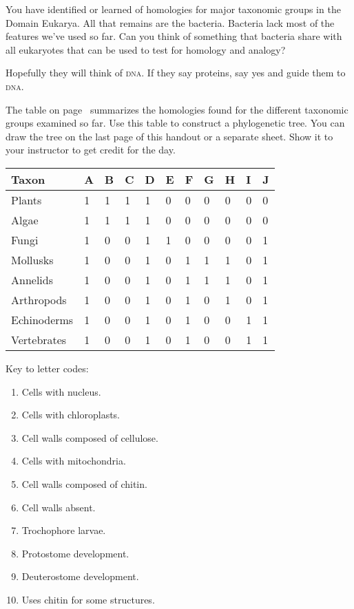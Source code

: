 \documentclass[12pt, hidelinks]{exam}
\newcommand*\AnswerBox[2]{%
    \parbox[t][#1]{0.92\textwidth}{%
    \begin{solution}#2\end{solution}}
    \vspace{\stretch{1}}
}
\begin{document}
\begin{questions}
\question
You have identified or learned of homologies for major taxonomic groups in the Domain Eukarya. All that remains are the bacteria. Bacteria lack most of the features we've used so far. Can you think of something that bacteria share with all eukaryotes that can be used to test for homology and analogy?

\AnswerBox{2\baselineskip}{Hopefully they will think of \textsc{dna}. If they say proteins, say yes and guide them to \textsc{dna.}}

\question[Checkout]
The table on page~\pageref{presence_table} summarizes the homologies found for the different taxonomic groups examined so far. Use this table to construct a phylogenetic tree. You can draw the tree on the last page of this handout or a separate sheet. Show it to your instructor to get credit for the day.


\end{questions}

\newpage

\begin{longtable}{@{}L{1in}L{0.25in}L{0.25in}L{0.25in}L{0.25in}L{0.25in}L{0.25in}L{0.25in}L{0.25in}L{0.25in}@{}}
\toprule
Taxon			&	A	&	B	&	C	&	D	&	E	&	F	&	G	&	H	&	I	&	J	\tabularnewline
\midrule
Plants			&	1	&	1	&	1	&	1	&	0	&	0	&	0	&	0	&	0	&	0	\tabularnewline
Algae			&	1	&	1	&	1	&	1	&	0	&	0	&	0	&	0	&	0	&	0	\tabularnewline
Fungi			&	1	&	0	&	0	&	1	&	1	&	0	&	0	&	0	&	0	&	1	\tabularnewline
Mollusks		&	1	&	0	&	0	&	1	&	0	&	1	&	1	&	1	&	0	&	1	\tabularnewline
Annelids		&	1	&	0	&	0	&	1	&	0	&	1	&	1	&	1	&	0	&	1	\tabularnewline
Arthropods	&	1	&	0	&	0	&	1	&	0	&	1	&	0	&	1	&	0	&	1	\tabularnewline
Echinoderms	&	1	&	0	&	0	&	1	&	0	&	1	&	0	&	0	&	1	&	1	\tabularnewline
Vertebrates	&	1	&	0	&	0	&	1	&	0	&	1	&	0	&	0	&	1	&	1	\tabularnewline
\bottomrule
\end{longtable}\label{presence_table}

Key to letter codes:

\begin{multicols}{2}
	\raggedcolumns
	\begin{enumerate}
		\item Cells with nucleus.
		\item Cells with chloroplasts.
		\item Cell walls composed of cellulose.
		\item Cells with mitochondria.
		\item Cell walls composed of chitin.
		\item Cell walls absent.
		\item Trochophore larvae.
		\item Protostome development.
		\item Deuterostome development.
		\item Uses chitin for some structures.
	\end{enumerate}
\end{multicols}
\end{document}
